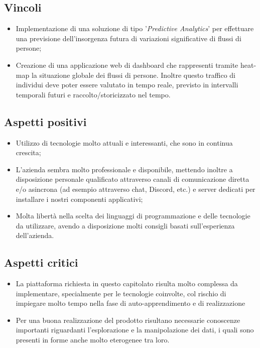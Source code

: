 \subsection{Vincoli}{
\begin{itemize}
\item Implementazione di una soluzione di tipo '\textit{Predictive Analytics}' per effettuare una previsione dell'insorgenza futura di variazioni significative di flussi di persone;
\item Creazione di una applicazione web di dashboard che rappresenti tramite heat-map la situazione globale dei flussi di persone. Inoltre questo traffico di individui deve poter essere valutato in tempo reale, previsto in intervalli temporali futuri e raccolto/storicizzato nel tempo.
\end{itemize}
}

\subsection{Aspetti positivi}{
\begin{itemize}
\item Utilizzo di tecnologie molto attuali e interessanti, che sono in continua crescita;
\item L'azienda sembra molto professionale e disponibile, mettendo inoltre a disposizione personale qualificato attraverso canali di comunicazione diretta e/o asincrona (ad esempio attraverso chat, Discord, etc.) e server dedicati per installare i nostri componenti applicativi;
\item Molta libertà nella scelta dei linguaggi di programmazione e delle tecnologie da utilizzare, avendo a disposizione molti consigli basati sull'esperienza dell'azienda.
\end{itemize}
}

\subsection{Aspetti critici}{
\begin{itemize}
\item La piattaforma richiesta in questo capitolato risulta molto complessa da implementare, specialmente per le tecnologie coinvolte, col rischio di impiegare molto tempo nella fase di auto-apprendimento e di realizzazione
\item Per una buona realizzazione del prodotto risultano necessarie conoscenze importanti riguardanti l'esplorazione e la manipolazione dei dati, i quali sono presenti in forme anche molto eterogenee tra loro.
\end{itemize}
}


